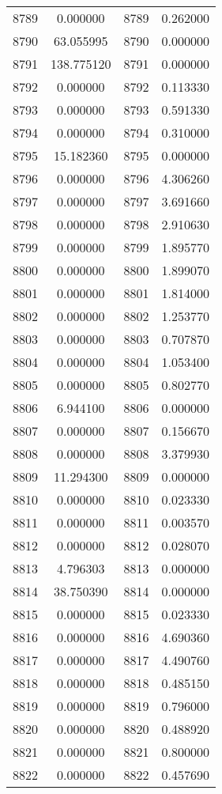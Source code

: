 \documentclass[12pt]{article}
\begin{document}
\begin{longtable}{@{}cccc@{}}
8789 & 0.000000 & 8789 & 0.262000 \\
8790 & 63.055995 & 8790 & 0.000000 \\
8791 & 138.775120 & 8791 & 0.000000 \\
8792 & 0.000000 & 8792 & 0.113330 \\
8793 & 0.000000 & 8793 & 0.591330 \\
8794 & 0.000000 & 8794 & 0.310000 \\
8795 & 15.182360 & 8795 & 0.000000 \\
8796 & 0.000000 & 8796 & 4.306260 \\
8797 & 0.000000 & 8797 & 3.691660 \\
8798 & 0.000000 & 8798 & 2.910630 \\
8799 & 0.000000 & 8799 & 1.895770 \\
8800 & 0.000000 & 8800 & 1.899070 \\
8801 & 0.000000 & 8801 & 1.814000 \\
8802 & 0.000000 & 8802 & 1.253770 \\
8803 & 0.000000 & 8803 & 0.707870 \\
8804 & 0.000000 & 8804 & 1.053400 \\
8805 & 0.000000 & 8805 & 0.802770 \\
8806 & 6.944100 & 8806 & 0.000000 \\
8807 & 0.000000 & 8807 & 0.156670 \\
8808 & 0.000000 & 8808 & 3.379930 \\
8809 & 11.294300 & 8809 & 0.000000 \\
8810 & 0.000000 & 8810 & 0.023330 \\
8811 & 0.000000 & 8811 & 0.003570 \\
8812 & 0.000000 & 8812 & 0.028070 \\
8813 & 4.796303 & 8813 & 0.000000 \\
8814 & 38.750390 & 8814 & 0.000000 \\
8815 & 0.000000 & 8815 & 0.023330 \\
8816 & 0.000000 & 8816 & 4.690360 \\
8817 & 0.000000 & 8817 & 4.490760 \\
8818 & 0.000000 & 8818 & 0.485150 \\
8819 & 0.000000 & 8819 & 0.796000 \\
8820 & 0.000000 & 8820 & 0.488920 \\
8821 & 0.000000 & 8821 & 0.800000 \\
8822 & 0.000000 & 8822 & 0.457690 \\

\end{longtable}
\end{document}
